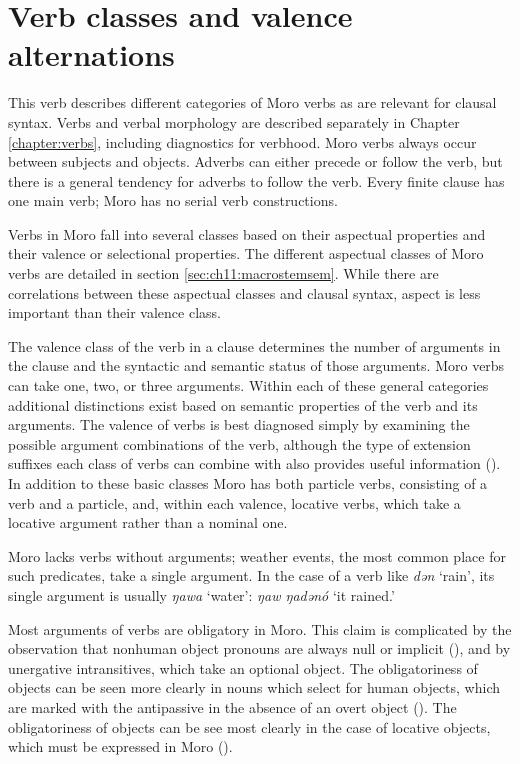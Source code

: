 \section{Verb classes and valence alternations}\label{sec:ch12:verbs}

This verb describes different categories of Moro verbs as are relevant for clausal syntax. Verbs and verbal morphology are described separately in Chapter \ref{chapter:verbs}, including diagnostics for verbhood. Moro verbs always occur between subjects and objects. Adverbs can either precede or follow the verb, but there is a general tendency for adverbs to follow the verb. Every finite clause has one main verb; Moro has no serial verb constructions.

Verbs in Moro fall into several classes based on their aspectual properties and their valence or selectional properties. The different aspectual classes of Moro verbs are detailed in section \ref{sec:ch11:macrostemsem}. While there are correlations between these aspectual classes and clausal syntax, aspect is less important than their valence class.

The valence class of the verb in a clause determines the number of arguments in the clause and the syntactic and semantic status of those arguments. Moro verbs can take one, two, or three arguments. Within each of these general categories additional distinctions exist based on semantic properties of the verb and its arguments. The valence of verbs is best diagnosed simply by examining the possible argument combinations of the verb, although the type of extension suffixes each class of verbs can combine with also provides useful information (). In addition to these basic classes Moro has both particle verbs, consisting of a verb and a particle, and, within each valence, locative verbs, which take a locative argument rather than a nominal one.

Moro lacks verbs without arguments; weather events, the most common place for such predicates, take a single argument. In the case of a verb like \textit{dən} `rain', its single argument is usually \textit{ŋawa} `water': \textit{ŋaw ŋadənó} `it rained.'

Most arguments of verbs are obligatory in Moro. This claim is complicated by the observation that nonhuman object pronouns are always null or implicit (), and by unergative intransitives, which take an optional object. The obligatoriness of objects can be seen more clearly in nouns which select for human objects, which are marked with the antipassive in the absence of an overt object (). The obligatoriness of objects can be see most clearly in the case of locative objects, which must be expressed in Moro ().

